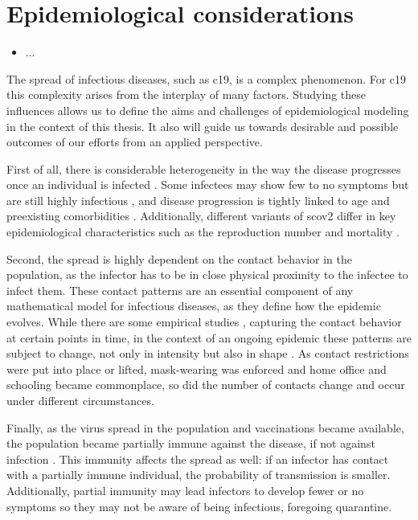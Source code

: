\glsresetall
\chapter{Epidemiological considerations}
\label{chap:epidemiological_considerations}
\begin{tcolorbox}[title={Contributions of this chapter}]
    \begin{itemize}
        \item ...
    \end{itemize}
\end{tcolorbox}
\newpage

The spread of infectious diseases, such as \acrshort{c19}, is a complex phenomenon. For \acrshort{c19} this complexity arises from the interplay of many factors. Studying these influences allows us to define the aims and challenges of epidemiological modeling in the context of this thesis. It also will guide us towards desirable and possible outcomes of our efforts from an applied perspective.

First of all, there is considerable heterogeneity in the way the disease progresses once an individual is infected \cite{Salzberger2021Epidemiology}. Some infectees may show few to no symptoms but are still highly infectious \cite{Byambasuren2020Estimating}, and disease progression is tightly linked to age and preexisting comorbidities \cite{Biswas2020Association}. Additionally, different variants of \acrshort{scov2} differ in key epidemiological characteristics such as the reproduction number \cite{Du2022Reproduction} and mortality \cite{Hughes2023Effect}. 

Second, the spread is highly dependent on the contact behavior in the population, as the infector has to be in close physical proximity to the infectee to infect them. These contact patterns are an essential component of any mathematical model for infectious diseases, as they define how the epidemic evolves. While there are some empirical studies \cite{Tomori2021Individual,Mossong2008Social}, capturing the contact behavior at certain points in time, in the context of an ongoing epidemic these patterns are subject to change, not only in intensity but also in shape \cite{Tomori2021Individual}. As contact restrictions were put into place or lifted, mask-wearing was enforced and home office and schooling became commonplace, so did the number of contacts change and occur under different circumstances. 

Finally, as the virus spread in the population and vaccinations became available, the population became partially immune against the disease, if not against infection . This immunity affects the spread as well: if an infector has contact with a partially immune individual, the probability of transmission is smaller. Additionally, partial immunity may lead infectors to develop fewer or no symptoms so they may not be aware of being infectious, foregoing quarantine.

